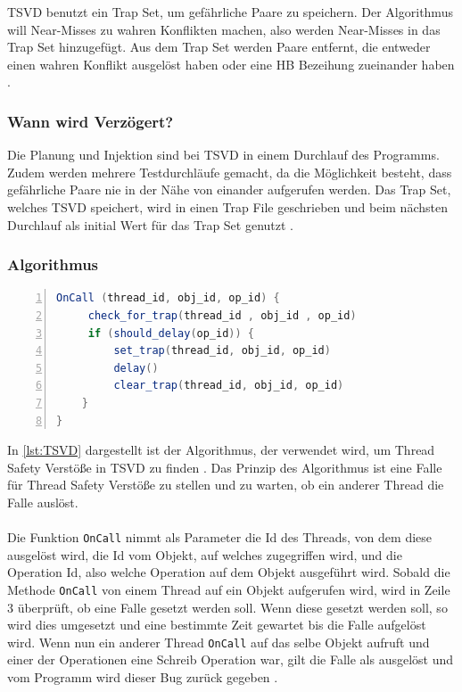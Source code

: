 \acs{TSVD} benutzt ein Trap Set, um gefährliche Paare zu speichern. Der Algorithmus will Near-Misses zu wahren Konflikten machen, also werden Near-Misses in das Trap Set hinzugefügt. Aus dem Trap Set werden Paare entfernt, die entweder einen wahren Konflikt ausgelöst haben oder eine \acs{HB} Bezeihung zueinander haben \cite[vgl.][167]{li_efficient_2019}.

\subsubsection*{Wann wird Verzögert?}

Die Planung und Injektion sind bei \acs{TSVD} in einem Durchlauf des Programms. Zudem werden mehrere Testdurchläufe gemacht, da die Möglichkeit besteht, dass gefährliche Paare nie in der Nähe von einander aufgerufen werden. Das Trap Set, welches \acs{TSVD} speichert, wird in einen Trap File geschrieben und beim nächsten Durchlauf als initial Wert für das Trap Set genutzt \cite[vgl.][169]{li_efficient_2019}.  


\subsubsection*{Algorithmus}

\begin{lstlisting}[language=Java,frame=tb,caption={\acs{TSVD} Trap Mechanism}, label={lst:TSVD}, numbers=left, stepnumber=1,  captionpos=b]
OnCall (thread_id, obj_id, op_id) { 
     check_for_trap(thread_id , obj_id , op_id) 
     if (should_delay(op_id)) {
         set_trap(thread_id, obj_id, op_id)
         delay()
         clear_trap(thread_id, obj_id, op_id)
    }
}
\end{lstlisting}

In \ref{lst:TSVD} dargestellt ist der Algorithmus, der verwendet wird, um Thread Safety Verstöße in \acs{TSVD} zu finden \cite[Figure 5,][166]{li_efficient_2019}. Das Prinzip des Algorithmus ist eine Falle für Thread Safety Verstöße zu stellen und zu warten, ob ein anderer Thread die Falle auslöst. \\
\\
Die Funktion \texttt{OnCall} nimmt als Parameter die Id des Threads, von dem diese ausgelöst wird, die Id vom Objekt, auf welches zugegriffen wird, und die Operation Id, also welche Operation auf dem Objekt ausgeführt wird. Sobald die Methode \texttt{OnCall} von einem Thread auf ein Objekt aufgerufen wird, wird in Zeile 3 überprüft, ob eine Falle gesetzt werden soll. Wenn diese gesetzt werden soll, so wird dies umgesetzt und eine bestimmte Zeit gewartet bis die Falle aufgelöst wird. Wenn nun ein anderer Thread \texttt{OnCall} auf das selbe Objekt aufruft und einer der Operationen eine Schreib Operation war, gilt die Falle als ausgelöst und vom Programm wird dieser Bug zurück gegeben \cite[vgl.][166]{li_efficient_2019}.


